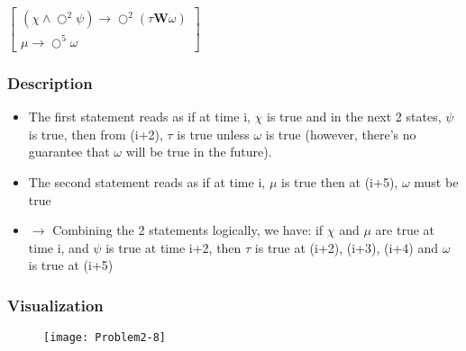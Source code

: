 \newpage
\subsection{}

$
\begin{bmatrix}
(\chi \land \bigcirc^{2} \psi) \rightarrow \bigcirc^{2} (\tau \textbf{W} \omega) \\
\mu \rightarrow \bigcirc^{5} \omega
\end{bmatrix}
$

\subsubsection{Description}
\begin{itemize}
    \item The first statement reads as if at time i, $\chi$ is true and in the next 2 states, $\psi$ is true, then from (i+2), $\tau$ is true unless $\omega$ is true (however, there's no guarantee that $\omega$ will be true in the future).
    \item The second statement reads as if at time i, $\mu$ is true then at (i+5), $\omega$ must be true
    \item[] $\rightarrow$ Combining the 2 statements logically, we have: if $\chi$ and $\mu$ are true at time i, and $\psi$ is true at time i+2, then $\tau$ is true at (i+2), (i+3), (i+4) and $\omega$ is true at (i+5)
\end{itemize}

\subsubsection{Visualization}

\begin{figure}[h!]
	\centering \texttt{[image: Problem2-8]}
\end{figure}
